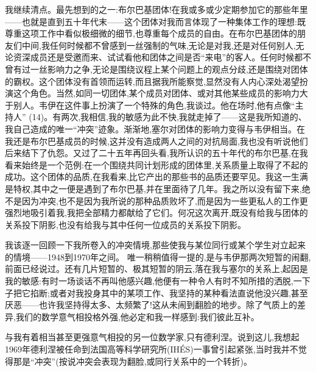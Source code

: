我继续清点。最先想到的之一:布尔巴基团体!在我或多或少定期参加它的那些年里——也就是直到五十年代末——这个团体对我而言体现了一种集体工作的理想:既尊重这项工作中看似极细微的细节,也尊重每个成员的自由。在布尔巴基团体的朋友们中间,我任何时候都不曾感到一丝强制的气味,无论是对我,还是对任何别人,无论资深成员还是受邀而来、试试看他和团体之间是否“来电”的客人。任何时候都不曾有过一丝影响力之争,无论是围绕议程上某个问题上的观点分歧,还是围绕对团体的霸权。这个团体没有首领而运转,而且据我所能察觉,显然没有人内心深处渴望扮演这个角色。当然,如同一切团体,某个成员对团体、或对其他某些成员的影响力大于别人。韦伊在这件事上扮演了一个特殊的角色,我谈过。他在场时,他有点像“主持人” (14)。有两次,我相信,我的敏感为此不快,我就走掉了——这是我所知道的、我自己造成的唯一“冲突”迹象。渐渐地,塞尔对团体的影响力变得与韦伊相当。在我还是布尔巴基成员的时候,这并没有造成两人之间的对抗局面,我也没有听说他们后来结下了仇怨。又过了二十五年再回头看,我所认识的五十年代的布尔巴基,在我看来始终是一个范例:在一个围绕共同计划形成的团体里,关系质量上取得了不起的成功。这个团体的品质,在我看来,比它产出的那些书的品质还要罕见。我这一生满是特权,其中之一便是遇到了布尔巴基,并在里面待了几年。我之所以没有留下来,绝不是因为冲突,也不是因为我所说的那种品质败坏了,而是因为一些更私人的工作更强烈地吸引着我,我把全部精力都献给了它们。何况这次离开,既没有给我与团体的关系投下阴影,也没有给我与其中任何一位成员的关系投下阴影。

我该逐一回顾一下我所卷入的冲突情境,那些使我与某位同行或某个学生对立起来的情境——1948到1970年之间。
唯一稍稍值得一提的,是与韦伊那两次短暂的闹翻,前面已经说过。还有几片短暂的、极其短暂的阴云,落在我与塞尔的关系上,起因是我的敏感:有时一场谈话不再叫他感兴趣,他便有一种令人有时不知所措的洒脱,一下子把它掐断;或者对我投身其中的某项工作、我坚持的某种看法直说他没兴趣,甚至厌恶——也许我坚持得太多、太频繁了!这从未闹到翻脸的地步。除了气质上的差异,我们的数学意气相投格外强,他必定和我一样感到:我们彼此互补。

与我有着相当甚至更强意气相投的另一位数学家,只有德利涅。说到这儿,我想起1969年德利涅被任命到法国高等科学研究所(IHÉS)一事曾引起紧张,当时我并不觉得那是“冲突”(按说冲突会表现为翻脸,或同行关系中的一个转折)。

